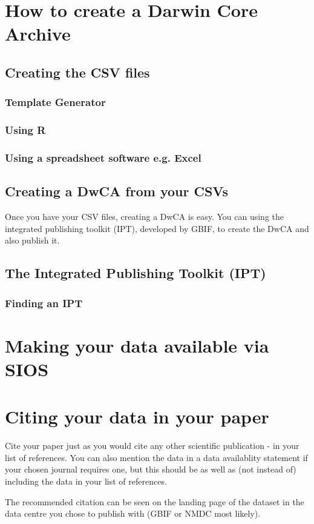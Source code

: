 \documentclass[a4paper,english, 11pt]{article}
\begin{document}
\section{How to create a Darwin Core Archive}
\label{s:how}

\subsection{Creating the CSV files}
\label{ss:CSVs}

\subsubsection{Template Generator}
\label{sss:tg}

\subsubsection{Using R}
\label{sss:r}

\subsubsection{Using a spreadsheet software e.g. Excel}
\label{sss:excel}

\subsection{Creating a DwCA from your CSVs}
\label{ss:csv2dwca}

Once you have your CSV files, creating a DwCA is easy. You can using the integrated publishing toolkit (IPT), developed by GBIF, to create the DwCA and also publish it.

\subsection{The Integrated Publishing Toolkit (IPT)}
\label{ss:ipt}

\subsubsection{Finding an IPT}
\label{sss:findingipt}

\section{Making your data available via SIOS}
\label{s:sios}

\section{Citing your data in your paper}
\label{s:citing}

Cite your paper just as you would cite any other scientific publication - in your list of references. You can also mention the data in a data availablity statement if your chosen journal requires one, but this should be as well as (not instead of) including the data in your list of references.

The recommended citation can be seen on the landing page of the dataset in the data centre you chose to publish with (GBIF or NMDC most likely).
\end{document}
